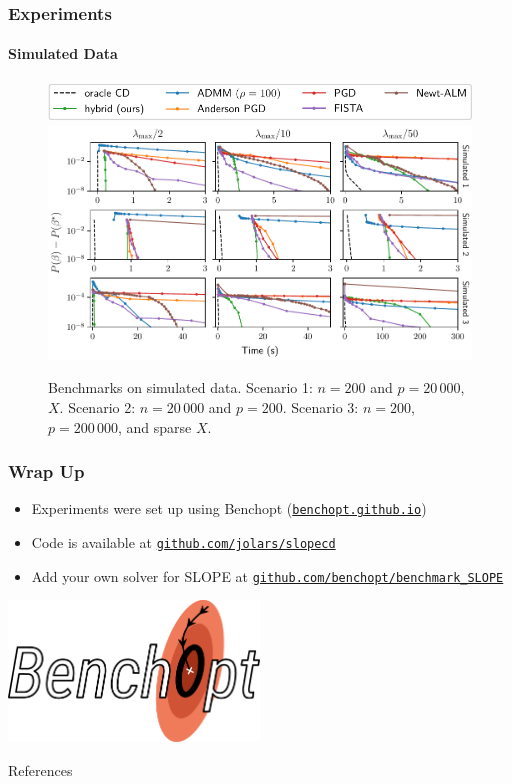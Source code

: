 \begin{frame}
  \frametitle{Experiments}
  \framesubtitle{Simulated Data}

  \begin{figure}[htpb]
    \centering
    \includegraphics[scale=0.55]{figures/simulated_legend.pdf}
    \includegraphics[scale=0.6]{figures/simulated.pdf}
    \caption{%
      Benchmarks on simulated data. Scenario 1: \(n = 200\) and \(p = 20\,000\), 
      \(X\). Scenario 2: \(n = 20\,000\) and \(p = 200\). Scenario 3: \(n = 200\), 
      \(p = 200\,000\), and sparse \(X\).
    }
  \end{figure}
\end{frame}

\begin{frame}[c]
  \frametitle{Wrap Up}

  \begin{itemize}
    \item Experiments were set up using
          Benchopt (\href{https://benchopt.github.io}{\texttt{benchopt.github.io}})
    \item Code is available at
          \href{https://github.com/jolars/slopecd}{\texttt{github.com/jolars/slopecd}}
    \item Add your own solver for SLOPE at
          \href{https://github.com/benchopt/benchmark\_SLOPE}{\texttt{github.com/benchopt/benchmark\_SLOPE}}
  \end{itemize}

  \vfill\hfill
  \includegraphics[width=0.5\textwidth]{figures/benchopt_logo.pdf}
\end{frame}

\begin{frame}[allowframebreaks]{References}
  \bibliographytrue
  \printbibliography[heading=none]
\end{frame}



